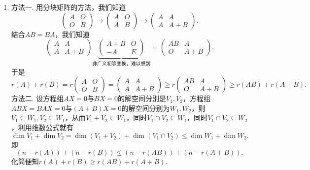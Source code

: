 \begin{enumerate}
    \item 方法一. 用分块矩阵的方法，我们知道
          \[ \begin{pmatrix}
                  A & O \\
                  O & B
              \end{pmatrix}
              \rightarrow
              \begin{pmatrix}
                  A & O \\
                  A & B
              \end{pmatrix}
              \rightarrow
              \begin{pmatrix}
                  A & A   \\
                  A & A+B
              \end{pmatrix}. \]
          结合$AB=BA$，我们知道
          \[ \begin{pmatrix}
                  A & A   \\
                  A & A+B
              \end{pmatrix}
              \underbrace{
                  \begin{pmatrix}
                      A+B & O \\
                      -A  & E
                  \end{pmatrix}
              }_{\text{非广义初等变换，难以想到}}
              =
              \begin{pmatrix}
                  AB & A   \\
                  O  & A+B
              \end{pmatrix}. \]
          于是
          \[ r(A)+r(B)=r
              \begin{pmatrix}
                  A & O \\
                  O & B
              \end{pmatrix}=
              \begin{pmatrix}
                  A & A   \\
                  A & A+B
              \end{pmatrix}\geqslant r
              \begin{pmatrix}
                  AB & A   \\
                  O  & A+B
              \end{pmatrix}\geqslant
              r(AB)+r(A+B). \]
          方法二. 设方程组$AX=0$与$BX=0$的解空间分别是$V_1, V_2$，方程组$ABX=BAX=0$与$(A+B)X=0$的解空间分别为$W_1, W_2$，则$V_1\subseteq W_1, V_2\subseteq W_1$，从而$V_1+V_2\subseteq W_1$，同时$V_1\cap V_2\subseteq W_1$，同时$V_1\cap V_2\subseteq W_2$，利用维数公式就有
          \[ \dim V_1+\dim V_2=\dim(V_1+V_2)+\dim(V_1\cap V_2)\leqslant \dim W_1+\dim W_2. \]
          即
          \[ (n-r(A))+(n-r(B))\leqslant (n-r(AB))+(n-r(A+B)). \]
          化简便知$r(A)+r(B)\geqslant r(AB)+r(A+B)$.


\end{enumerate}
